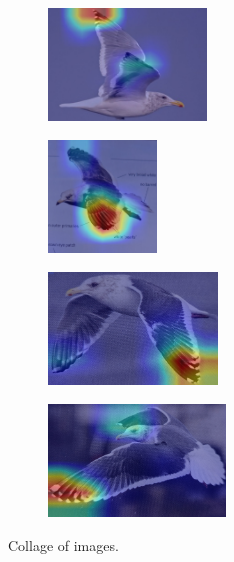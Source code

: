 \documentclass[a4paper,12pt]{report}
\begin{document}
\begin{figure}[htbp]
    \centering
    \begin{subfigure}[b]{0.13\textwidth}
        \includegraphics[height=3cm]{images/interpretability/vgg/bird1.jpg}
    \end{subfigure}
    \begin{subfigure}[b]{0.13\textwidth}
        \includegraphics[height=3cm]{images/interpretability/vgg/bird2.jpg}
    \end{subfigure}
    \begin{subfigure}[b]{0.13\textwidth}
        \includegraphics[height=3cm]{images/interpretability/vgg/bird3.jpg}
    \end{subfigure}
    \begin{subfigure}[b]{0.13\textwidth}
        \includegraphics[height=3cm]{images/interpretability/vgg/bird4.jpg}
    \end{subfigure}
    \caption{Collage of images.}
    \label{fig:collage}
\end{figure}
\end{document}
